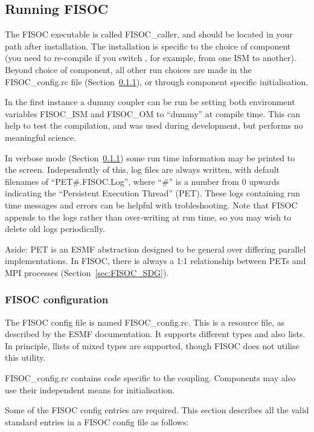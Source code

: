 \documentclass[12pt]{article}
\begin{document}
\subsection{Running FISOC}

The FISOC executable is called FISOC\_caller, and should be located in your path after installation. 
The installation is specific to the choice of component (you need to re-compile if you switch , for 
example, from one ISM to another).  
Beyond choice of component, all other run choices are made in the FISOC\_config.rc file
(Section~\ref{sec:config}), 
or through component specific initialisation.

In the first instance a dummy coupler can be run be setting both environment variables FISOC\_ISM and 
FISOC\_OM to ``dummy'' at compile time.  This can help to test the compilation, and was used during development, 
but performs no meaningful science.  

In verbose mode (Section~\ref{sec:config}) some run time information may be printed to the screen.  
Independently of this, log files are always written, 
with default filenames of ``PET\#.FISOC.Log'', where ``\#'' is a number from 0 upwards indicating the 
``Persistent Execution Thread'' (PET). 
These logs containing run time messages and errors can be helpful with trobleshooting.
Note that FISOC appends to the logs rather than over-writing at run time, so you may wish to delete old logs 
periodically. 

Aside: PET is an ESMF abstraction designed to be general over differing parallel implementations. 
In FISOC, there is always a 1:1 relationship between PETs and MPI processes 
(Section~\ref{sec:FISOC_SDG}). 


\subsubsection{FISOC configuration}
\label{sec:config}

The FISOC config file is named FISOC\_config.rc.  This is a resource file, as described by the 
ESMF documentation.  It supports different types and also lists. 
In principle, llists of mixed types are supported, though FISOC does not utilise this utility.

FISOC\_config.rc contains code specific to the coupling.  Components may also use their 
independent means for initialisation.

Some of the FISOC config entries are required.
This section describes all the valid standard entries in a FISOC config file as follows:
\end{document}
